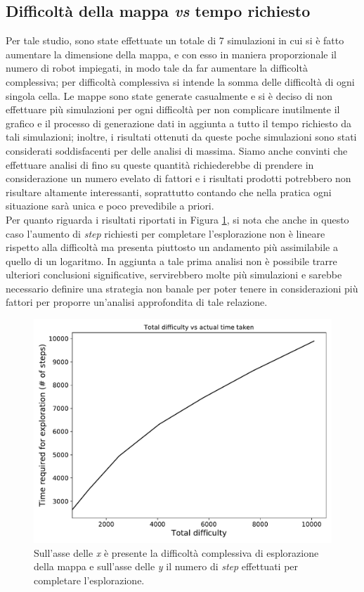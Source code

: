\subsection{Difficoltà della mappa \textit{vs} tempo richiesto}
Per tale studio, sono state effettuate un totale di 7 simulazioni in cui si è fatto aumentare la dimensione della mappa, e con esso in maniera proporzionale il numero di robot impiegati, in modo tale da far aumentare la difficoltà complessiva; per difficoltà complessiva si intende la somma delle difficoltà di ogni singola cella.
Le mappe sono state generate casualmente e si è deciso di non effettuare più simulazioni per ogni difficoltà per non complicare inutilmente il grafico e il processo di generazione dati in aggiunta a tutto il tempo richiesto da tali simulazioni; inoltre, i risultati ottenuti da queste poche simulazioni sono stati considerati soddisfacenti per delle analisi di massima.
Siamo anche convinti che effettuare analisi di fino su queste quantità richiederebbe di prendere in considerazione un numero evelato di fattori e i risultati prodotti potrebbero non risultare altamente interessanti, soprattutto contando che nella pratica ogni situazione sarà unica e poco prevedibile a priori.\\
Per quanto riguarda i risultati riportati in Figura \ref{fig:difficulty}, si nota che anche in questo caso l'aumento di \textit{step} richiesti per completare l'esplorazione non è lineare rispetto alla difficoltà ma presenta piuttosto un andamento più assimilabile a quello di un logaritmo.
In aggiunta a tale prima analisi non è possibile trarre ulteriori conclusioni significative, servirebbero molte più simulazioni e sarebbe necessario definire una strategia non banale per poter tenere in considerazioni più fattori per proporre un'analisi approfondita di tale relazione.
\begin{figure}
	\centering
	\includegraphics[width=0.9\linewidth]{images/macro_results/difficulty}
	\caption{Sull'asse delle \textit{x} è presente la difficoltà complessiva di esplorazione della mappa e sull'asse delle \textit{y} il numero di \textit{step} effettuati per completare l'esplorazione.}
	\label{fig:difficulty}
\end{figure}
